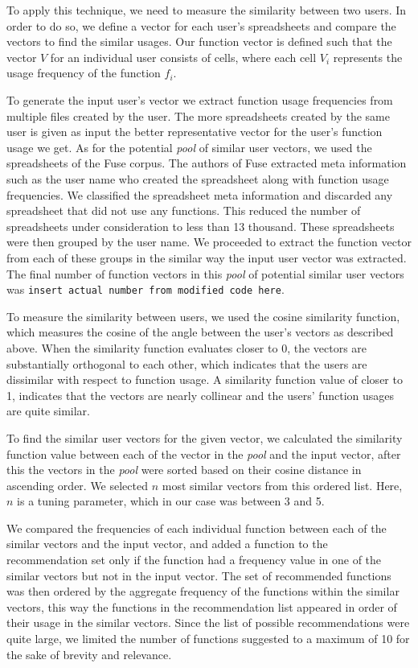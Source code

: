 \documentclass{article} %
\begin{document}
To apply this technique, we need to measure the similarity between two users. In order to do so, we define a vector for each user's spreadsheets and compare the vectors to find the similar usages. Our function vector is defined such that the vector $V$ for an individual user consists of cells, where each cell $V_i$ represents the usage frequency of the function $f_i$.

To generate the input user's vector we extract function usage frequencies from multiple files created by the user. The more spreadsheets created by the same user is given as input the better representative vector for the user's function usage we get. As for the potential \textit{pool} of similar user vectors, we used the spreadsheets of the Fuse corpus. The authors of Fuse extracted meta information such as the user name who created the spreadsheet along with function usage frequencies. We classified the spreadsheet meta information and discarded any spreadsheet that did not use any functions. This reduced the number of spreadsheets under consideration to less than 13 thousand. These spreadsheets were then grouped by the user name. We proceeded to extract the function vector from each of these groups in the similar way the input user vector was extracted. The final number of function vectors in this \textit{pool} of potential similar user vectors was \texttt{insert actual number from modified code here}.

To measure the similarity between users, we used the cosine similarity function, which measures the cosine of the angle between the user's vectors as described above. When the similarity function evaluates closer to 0, the vectors are substantially orthogonal to each other, which indicates that the users are dissimilar with respect to function usage. A similarity function value of closer to 1, indicates that the vectors are nearly collinear and the users' function usages are quite similar.

To find the similar user vectors for the given vector, we calculated the similarity function value between each of the vector in the \textit{pool} and the input vector, after this the vectors in the \textit{pool} were sorted based on their cosine distance in ascending order. We selected $n$ most similar vectors from this ordered list. Here, $n$ is a tuning parameter, which in our case was between 3 and 5.

We compared the frequencies of each individual function between each of the similar vectors and the input vector, and added a function to the recommendation set only if the function had a frequency value in one of the similar vectors but not in the input vector. The set of recommended functions was then ordered by the aggregate frequency of the functions within the similar vectors, this way the functions in the recommendation list appeared in order of their usage in the similar vectors. Since the list of possible recommendations were quite large, we limited the number of functions suggested to a maximum of 10 for the sake of brevity and relevance.
\end{document}
